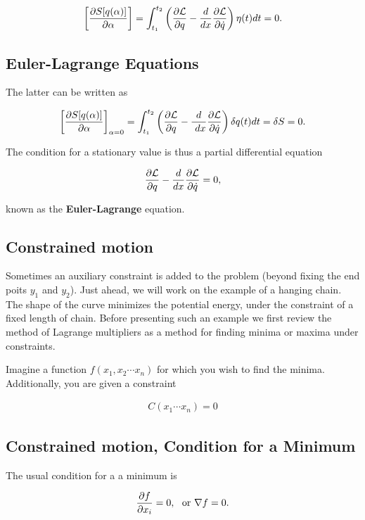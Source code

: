 \documentclass[%
oneside,                 %
final,                   %
10pt]{article}
\begin{document}
\[
\left[\frac{\partial  S[q(\alpha)]}{\partial \alpha}\right]=\int_{t_1}^{t_2} \left( \frac{\partial {\cal L}}{\partial q}-\frac{d}{dx}\frac{\partial {\cal L}}{\partial \dot{q}}
\right)\eta(t)dt=0.
\]

\subsection{Euler-Lagrange Equations}

The latter can be written as

\[
\left[\frac{\partial  S[q(\alpha)]}{\partial \alpha}\right]_{\alpha=0}=\int_{t_1}^{t_2} \left( \frac{\partial {\cal L}}{\partial q}-\frac{d}{\
dx}\frac{\partial {\cal L}}{\partial \dot{q}}\right)\delta q(t)dt=\delta S = 0.
\]

The condition for a stationary value is thus a partial differential equation

\[
\frac{\partial {\cal L}}{\partial q}-\frac{d}{dx}\frac{\partial {\cal L}}{\partial \dot{q}}=0,
\]

known as the \textbf{Euler-Lagrange} equation.

\subsection{Constrained motion}

Sometimes an auxiliary constraint is added to the problem (beyond
fixing the end poits $y_1$ and $y_2$). Just ahead, we will work on the
example of a hanging chain. The shape of the curve minimizes the
potential energy, under the constraint of a fixed length of
chain. Before presenting such an example we first review the method of
Lagrange multipliers as a method for finding minima or maxima under
constraints.

Imagine a function $f(x_1,x_2\cdots x_n)$ for which you wish to find
the minima. Additionally, you are given a constraint

\begin{eqnarray}
C(x_1\cdots x_n)=0
\end{eqnarray}

\subsection{Constrained motion, Condition for a Minimum}

The usual condition for a a minimum is

\begin{eqnarray}
\frac{\partial f}{\partial x_i}=0{\rm ,~~or~}\nabla f=0.
\end{eqnarray}
\end{document}
